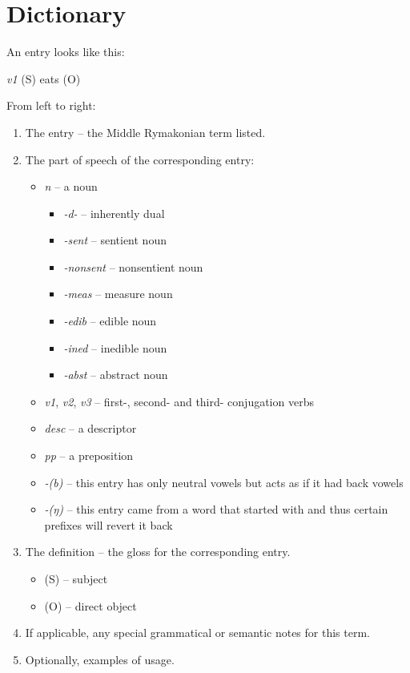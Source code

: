 \documentclass{book}
\newcommand{\lname}{Middle Rymakonian}
\begin{document}
\chapter{Dictionary}

An entry looks like this:

 \textit{v1}
\quad (S) eats (O)

From left to right:

\begin{enumerate}
    \item The entry -- the \lname{} term listed.
    \item The part of speech of the corresponding entry:
    \begin{itemize}
        \item \textit{n} -- a noun
        \begin{itemize}
          \item \textit{-d-} -- inherently dual
          \item \textit{-sent} -- sentient noun
          \item \textit{-nonsent} -- nonsentient noun
          \item \textit{-meas} -- measure noun
          \item \textit{-edib} -- edible noun
          \item \textit{-ined} -- inedible noun
          \item \textit{-abst} -- abstract noun
        \end{itemize}
        \item \textit{v1}, \textit{v2}, \textit{v3} -- first-, second- and third- conjugation verbs
        \item \textit{desc} -- a descriptor
        \item \textit{pp} -- a preposition
        \item \textit{-(b)} -- this entry has only neutral vowels but acts as if it had back vowels
        \item \textit{-(ŋ)} -- this entry came from a word that started with  and thus certain prefixes will revert it back
    \end{itemize}
    \item The definition -- the gloss for the corresponding entry.
    \begin{itemize}
        \item (S) -- subject
        \item (O) -- direct object
    \end{itemize}
    \item If applicable, any special grammatical or semantic notes for this term.
    \item Optionally, examples of usage.
\end{enumerate}

\begin{multicols}{2}
    
\end{multicols}
\end{document}
